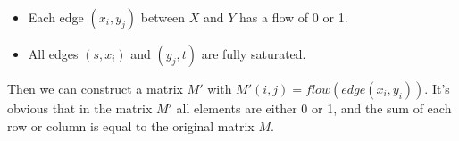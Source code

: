 \begin{itemize}
  \item{Each edge $(x_i, y_j)$ between $X$ and $Y$} has a flow of 0 or 1.
  \item{All edges $(s, x_i)$ and $(y_j, t)$ are fully saturated}.
\end{itemize}

Then we can construct a matrix $M'$ with $M'(i, j) = flow(edge(x_i, y_i))$. It's obvious that in the matrix $M'$ all elements are either 0 or 1, and the sum of each row or column is equal to the original matrix $M$.
